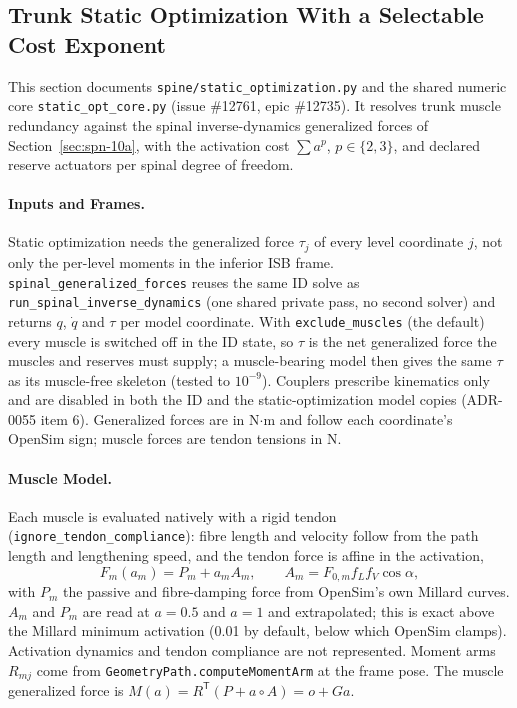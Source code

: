 \subsection{Trunk Static Optimization With a Selectable Cost Exponent}
\label{sec:spn-10b}

This section documents \texttt{spine/static\_optimization.py} and the shared
numeric core \texttt{static\_opt\_core.py} (issue \#12761, epic \#12735). It
resolves trunk muscle redundancy against the spinal inverse-dynamics
generalized forces of Section~\ref{sec:spn-10a}, with the activation cost
$\sum a^p$, $p\in\{2,3\}$, and declared reserve actuators per spinal degree of
freedom.

\paragraph{Inputs and Frames.}
Static optimization needs the generalized force $\tau_j$ of every level
coordinate $j$, not only the per-level moments in the inferior ISB frame.
\texttt{spinal\_generalized\_forces} reuses the same ID solve as
\texttt{run\_spinal\_inverse\_dynamics} (one shared private pass, no second
solver) and returns $q$, $\dot q$ and $\tau$ per model coordinate. With
\texttt{exclude\_muscles} (the default) every muscle is switched off in the ID
state, so $\tau$ is the net generalized force the muscles and reserves must
supply; a muscle-bearing model then gives the same $\tau$ as its muscle-free
skeleton (tested to $10^{-9}$). Couplers prescribe kinematics only and are
disabled in both the ID and the static-optimization model copies (ADR-0055
item 6). Generalized forces are in N$\cdot$m and follow each coordinate's
OpenSim sign; muscle forces are tendon tensions in N.

\paragraph{Muscle Model.}
Each muscle is evaluated natively with a rigid tendon
(\texttt{ignore\_tendon\_compliance}): fibre length and velocity follow from
the path length and lengthening speed, and the tendon force is affine in the
activation,
\[
  F_m(a_m) = P_m + a_m A_m, \qquad A_m = F_{0,m} f_L f_V \cos\alpha ,
\]
with $P_m$ the passive and fibre-damping force from OpenSim's own Millard
curves. $A_m$ and $P_m$ are read at $a=0.5$ and $a=1$ and extrapolated; this is
exact above the Millard minimum activation (0.01 by default, below which
OpenSim clamps). Activation dynamics and tendon compliance are not represented.
Moment arms $R_{mj}$ come from \texttt{GeometryPath.computeMomentArm} at the
frame pose. The muscle generalized force is $M(a) = R^{\mathsf T}(P + a\circ A)
= o + G a$.

